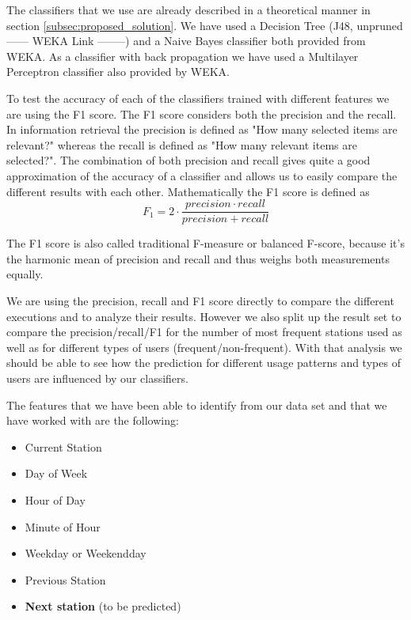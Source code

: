 The classifiers that we use are already described in a theoretical manner in section \ref{subsec:proposed_solution}. We have used a Decision Tree (J48, unpruned ------ WEKA Link --------) and a Naive Bayes classifier both provided from WEKA. As a classifier with back propagation we have used a Multilayer Perceptron classifier also provided by WEKA.

To test the accuracy of each of the classifiers trained with different features we are using the F1 score. The F1 score considers both the precision and the recall. In information retrieval the precision is defined as "How many selected items are relevant?" whereas the recall is defined as "How many relevant items are selected?". The combination of both precision and recall gives quite a good approximation of the accuracy of a classifier and allows us to easily compare the different results with each other. Mathematically the F1 score is defined as 
\begin{equation}\label{equation:F1Score}
F_{1} = 2 \cdot \frac{precision \cdot recall}{precision + recall}
\end{equation}

The F1 score is also called traditional F-measure or balanced F-score, because it's the harmonic mean of precision and recall and thus weighs both measurements equally.

We are using the precision, recall and F1 score directly to compare the different executions and to analyze their results. However we also split up the result set to compare the precision/recall/F1 for the number of most frequent stations used as well as for different types of users (frequent/non-frequent). With that analysis we should be able to see how the prediction for different usage patterns and types of users are influenced by our classifiers.

The features that we have been able to identify from our data set and that we have worked with are the following:
\begin{itemize}
	\item Current Station
	\item Day of Week
	\item Hour of Day
	\item Minute of Hour
	\item Weekday or Weekendday
	\item Previous Station
	\item \textbf{Next station} (to be predicted)
\end{itemize}

